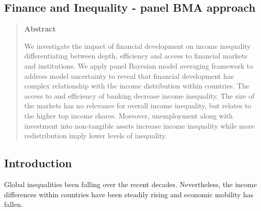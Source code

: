 \begin{refsection}
\chapter{Finance and Inequality - panel BMA approach}
\label{ch4}

\begin{quote}
\begin{center}\textbf{Abstract}\end{center}
	We investigate the impact of financial development on income inequality differentiating between depth, efficiency and access to financial markets and institutions. We apply panel Bayesian model averaging framework to address model uncertainty to reveal that financial development has complex relationship with the income distribution within countries. The access to and efficiency of banking decrease income inequality. The size of the markets has no relevance for overall income inequality, but relates to the higher top income shares. Moreover, unemployment along with investment into non-tangible assets increase income inequality while more redistribution imply lower levels of inequality.  
	\end{quote}

\newpage



\section{Introduction}
Global inequalities been falling over the recent decades. Nevertheless, the income differences within countries have been steadily rising and economic mobility has fallen. 


\end{refsection}

